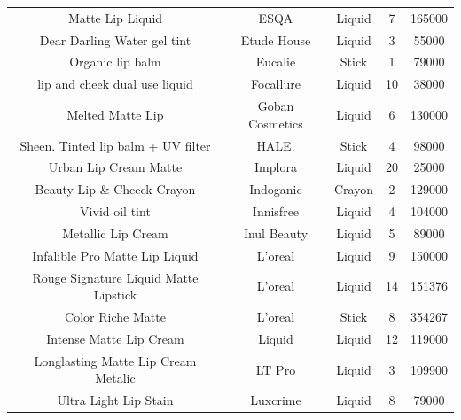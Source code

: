 \documentclass{article}
\begin{document}
\begin{longtable}{ccccc}
    Matte Lip Liquid                        & ESQA              & Liquid                       & 7               & 165000         \\
    Dear Darling Water gel tint             & Etude House       & Liquid                       & 3               & 55000          \\
    Organic lip balm                        & Eucalie           & Stick                        & 1               & 79000          \\
    lip and cheek dual use liquid           & Focallure         & Liquid                       & 10              & 38000          \\
    Melted Matte Lip                        & Goban Cosmetics   & Liquid                       & 6               & 130000         \\
    Sheen. Tinted lip balm + UV filter      & HALE.             & Stick                        & 4               & 98000          \\
    Urban Lip Cream Matte                   & Implora           & Liquid                       & 20              & 25000          \\
    Beauty Lip \& Cheeck Crayon             & Indoganic         & Crayon                       & 2               & 129000         \\
    Vivid oil tint                          & Innisfree         & Liquid                       & 4               & 104000         \\
    Metallic Lip Cream                      & Inul Beauty       & Liquid                       & 5               & 89000          \\
    Infalible Pro Matte Lip Liquid          & L'oreal           & Liquid                       & 9               & 150000         \\
    Rouge Signature Liquid Matte Lipstick   & L'oreal           & Liquid                       & 14              & 151376         \\
    Color Riche Matte                       & L'oreal           & Stick                        & 8               & 354267         \\
    Intense Matte Lip Cream                 & Liquid            & Liquid                       & 12              & 119000         \\
    Longlasting Matte Lip Cream Metalic     & LT Pro            & Liquid                       & 3               & 109900         \\
    Ultra Light Lip Stain                   & Luxcrime          & Liquid                       & 8               & 79000          \\

\end{longtable}
\end{document}

